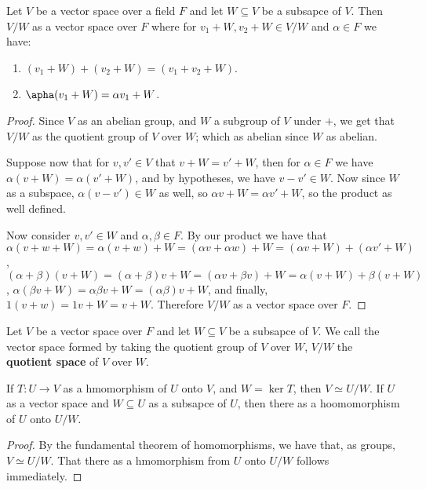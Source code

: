 \begin{lemma}\label{1.1.4}
    Let $V$ be a vector space over a field  $F$ and let  $W \subseteq V$ be a
    subsapce of  $V$. Then  $V/W$ as a vector space over  $F$ where for $
    v_1+W,v_2+W \in V/W$ and $\alpha \in F$ we have:
        \begin{enumerate}[label=(\arabic*)]
            \item $(v_1+W)+(v_2+W)=(v_1+v_2+W)$.

            \item $\apha(v_1+W)=\alpha v_1+W$.
        \end{enumerate}
\end{lemma}
\begin{proof}
    Since $V$ as an abelian group, and  $W$ a subgroup of  $V$ under  $+$, we
    get that  $V/W$ as the quotient group of  $V$ over  $W$; which as abelian
    since  $W$ as abelian.

    Suppose now that for $v,v' \in V$ that  $v+W=v'+W$, then for  $\alpha \in F$
    we have  $\alpha(v+W)=\alpha(v'+W)$, and by hypotheses, we have $v-v' \in
    W$. Now since  $W$ as a subspace,  $\alpha(v-v') \in W$ as well, so $\alpha
    v+W=\alpha v'+W$, so the product as well defined.

    Now consider  $v,v' \in W$ and  $\alpha, \beta \in F$. By our product we
    have that  $\alpha(v+w+W)=\alpha(v+w)+W=(\alpha v+ \alpha w)+W=(\alpha
    v+W)+(\alpha v'+W)$, $(\alpha+\beta)(v+W)=(\alpha+\beta)v+W=(\alpha v+\beta
    v)+W=\alpha(v+W)+\beta(v+W)$, $\alpha(\beta v+W)=\alpha\beta v+W=(\alpha\beta)
    v+W$, and finally, $1(v+w)=1v+W=v+W$. Therefore $V/W$ as a vector space over
     $F$.
\end{proof}

\begin{definition}
    Let $V$ be a vector space over  $F$ and let  $W \subseteq V$ be a subsapce
    of  $V$. We call the vector space formed by taking the quotient group of
    $V$ over  $W$,  $V/W$ the  \textbf{quotient space} of $V$ over  $W$.
\end{definition}

\begin{theorem}\label{1.1.5}
    If $T:U \rightarrow V$ as a hmomorphism of $U$ onto  $V$, and  $W=\ker{T}$,
    then $V \simeq U/W$. If  $U$ as a vector space and  $W \subseteq U$ as a
    subsapce of  $U$, then  there as a hoomomorphism of  $U$ onto  $U/W$.
\end{theorem}
\begin{proof}
    By the fundamental theorem of homomorphisms, we have that, as groups, $V
    \simeq U/W$. That there as a hmomorphism from  $U$ onto  $U/W$ follows
    immediately.
\end{proof}

